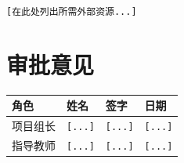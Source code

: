 \documentclass[12pt]{ctexart}
\begin{document}
\texttt{[在此处列出所需外部资源...]}

\section{审批意见}
\begin{center}
\begin{tabular}{|p{3cm}|p{3cm}|p{3cm}|p{3cm}|}
\hline
\textbf{角色} & \textbf{姓名} & \textbf{签字} & \textbf{日期} \\
\hline
项目组长 & \texttt{[...]} & \texttt{[...]} & \texttt{[...]} \\
\hline
指导教师 & \texttt{[...]} & \texttt{[...]} & \texttt{[...]} \\
\hline
\end{tabular}
\end{center}

\end{document}
